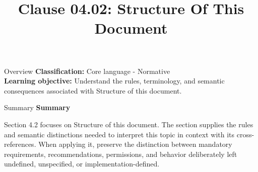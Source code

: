 \documentclass[10pt,letterpaper]{article}
\title{Clause 04.02: Structure Of This Document}
\author{}
\date{}
\begin{document}
\maketitle
\begin{CornellOverviewBox}{Overview}
\textbf{Classification:} Core language - Normative\\[2pt]
\textbf{Learning objective:} Understand the rules, terminology, and semantic consequences associated with Structure of this document.
\end{CornellOverviewBox}\begin{CornellSummaryBox}{Summary}
{\sffamily\bfseries\color{Accent} Summary}\par\vspace{3pt}Section 4.2 focuses on Structure of this document. The section supplies the rules and semantic distinctions needed to interpret this topic in context with its cross-references. When applying it, preserve the distinction between mandatory requirements, recommendations, permissions, and behavior deliberately left undefined, unspecified, or implementation-defined.
\end{CornellSummaryBox}
\end{document}
